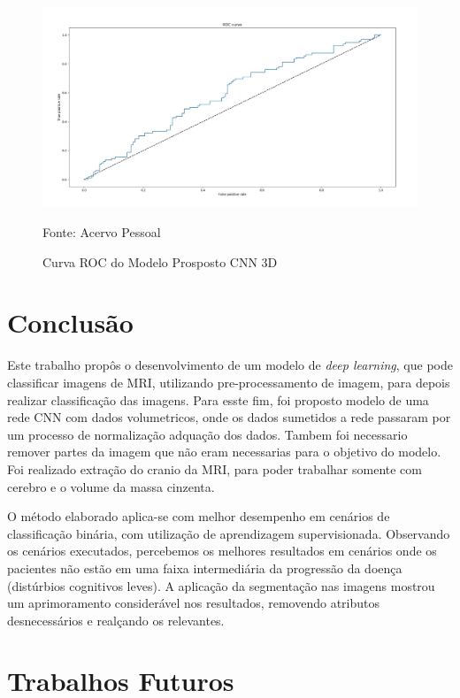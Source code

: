 \documentclass[openright]{UFRGS} %
\begin{document}
\begin{figure}[h]
    \centering
    \caption{Curva ROC do Modelo Prosposto CNN 3D}
    \includegraphics[scale=0.40]{ROC8.jpeg}
    \centerline{Fonte: Acervo Pessoal}
    \label{fig:rocCurve}
\end{figure}






\chapter{Conclusão}

Este trabalho propôs o desenvolvimento de um modelo de \textit{deep learning}, que pode classificar imagens de MRI,
utilizando pre-processamento de imagem, para depois realizar classificação das imagens. Para esste fim, foi proposto modelo de uma rede CNN com dados
volumetricos, onde os dados sumetidos a rede passaram por um processo de
normalização adquação dos dados. Tambem foi necessario  remover partes da imagem que não eram  necessarias para o objetivo do modelo. Foi realizado  extração do cranio da MRI, para poder trabalhar somente com cerebro e o volume da massa cinzenta.




O método elaborado aplica-se com melhor desempenho em cenários de classificação
binária, com utilização de aprendizagem supervisionada. Observando os cenários executados, percebemos os melhores resultados em cenários onde os pacientes não estão em
uma faixa intermediária da progressão da doença (distúrbios cognitivos leves). A aplicação da segmentação nas imagens mostrou um aprimoramento considerável nos resultados,
removendo atributos desnecessários e realçando os relevantes.






\chapter{Trabalhos Futuros}
\end{document}
